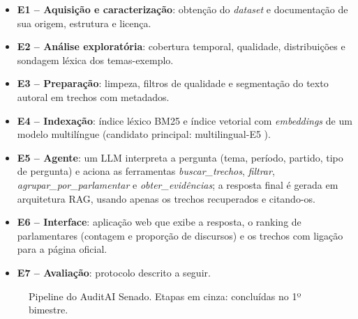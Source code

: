 \documentclass[12pt]{article}
\begin{document}
\begin{itemize}
  \item \textbf{E1 -- Aquisição e caracterização}: obtenção do \textit{dataset} e documentação de
  sua origem, estrutura e licença.
  \item \textbf{E2 -- Análise exploratória}: cobertura temporal, qualidade, distribuições e
  sondagem léxica dos temas-exemplo.
  \item \textbf{E3 -- Preparação}: limpeza, filtros de qualidade e segmentação do texto autoral em
  trechos com metadados.
  \item \textbf{E4 -- Indexação}: índice léxico BM25 e índice vetorial com \textit{embeddings} de
  um modelo multilíngue (candidato principal: multilingual-E5 \cite{wang2024e5}).
  \item \textbf{E5 -- Agente}: um LLM interpreta a pergunta (tema, período, partido, tipo de
  pergunta) e aciona as ferramentas \emph{buscar\_trechos}, \emph{filtrar},
  \emph{agrupar\_por\_parlamentar} e \emph{obter\_evidências}; a resposta final é gerada em
  arquitetura RAG, usando apenas os trechos recuperados e citando-os.
  \item \textbf{E6 -- Interface}: aplicação web que exibe a resposta, o ranking de parlamentares
  (contagem e proporção de discursos) e os trechos com ligação para a página oficial.
  \item \textbf{E7 -- Avaliação}: protocolo descrito a seguir.
\end{itemize}

\begin{figure}[ht]
\centering
{}
\caption{Pipeline do AuditAI Senado. Etapas em cinza: concluídas no 1º bimestre.}
\label{fig:pipeline}
\end{figure}
\end{document}
